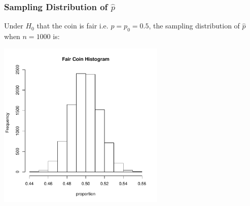\documentclass[handout]{beamer}
\newcommand{\blue}[1]{\textcolor{blue2}{#1}}
\begin{document}
\begin{frame}
\frametitle{Sampling Distribution of $\widehat{p}$}
\blue{Under $H_0$ that the coin is fair} i.e. $p=p_0=0.5$, the sampling distribution of $\widehat{p}$ when $n=1000$ is:

\begin{center}
\includegraphics[width=0.6\textwidth]{figure/hist1}
\end{center}
\end{frame}


%
%
%
%
%
%
%
%
\end{document}
